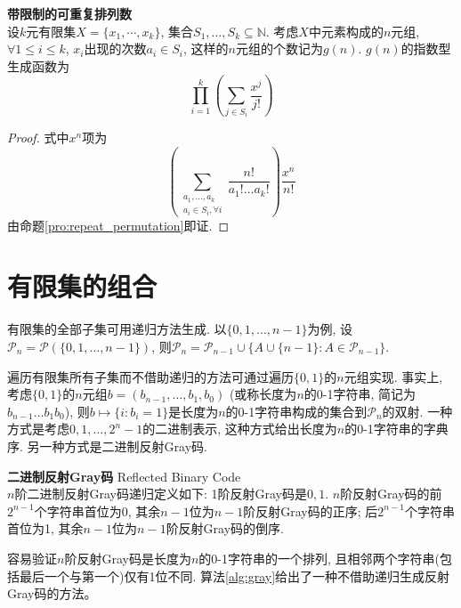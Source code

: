 \begin{pro} \textbf{带限制的可重复排列数}\\
设$k$元有限集$X=\{x_1,\cdots,x_k\}$, 集合$S_1,\dots, S_k\subseteq \mathbb{N}$. 考虑$X$中元素构成的$n$元组, $\forall 1\le i \le k$, $x_i$出现的次数$a_i\in S_i$, 这样的$n$元组的个数记为$g(n)$. $g(n)$的指数型生成函数为
\begin{equation}
    \prod_{i=1}^k \left(\sum_{j\in S_i} \frac{x^j}{j!}\right)
\end{equation}
\end{pro}
\begin{proof}
式中$x^n$项为
\begin{equation*}
\left(\sum_{\substack{a_1,\dots,a_k\\a_i\in S_i, \forall i}} \frac{n!}{a_1!\dots a_k!} \right)\frac{x^n}{n!}
\end{equation*}
由命题\ref{pro:repeat_permutation}即证. 
\end{proof}

\section{有限集的组合}

\par 有限集的全部子集可用递归方法生成. 以$\{0,1,\dots,n-1\}$为例, 设$\mathcal{P}_{n}=\mathcal{P}(\{0,1,\dots,n-1\})$, 则$\mathcal{P}_{n} = \mathcal{P}_{n-1} \cup \{A\cup \{n-1\}: A\in \mathcal{P}_{n-1}\}$.

\par 遍历有限集所有子集而不借助递归的方法可通过遍历$\{0,1\}$的$n$元组实现. 事实上, 考虑$\{0,1\}$的$n$元组$b=(b_{n-1}, \dots, b_1, b_0)$ (或称长度为$n$的0-1字符串, 简记为$b_{n-1}\dots b_1 b_0$), 则$b\mapsto \{i: b_i=1\}$是长度为$n$的0-1字符串构成的集合到$\mathcal{P}_n$的双射. 一种方式是考虑$0,1,\dots,2^n-1$的二进制表示, 这种方式给出长度为$n$的0-1字符串的字典序. 另一种方式是二进制反射Gray码.

\begin{dfn}\textbf{二进制反射Gray码} Reflected Binary Code\\
$n$阶二进制反射Gray码递归定义如下: 1阶反射Gray码是$0,1$. $n$阶反射Gray码的前$2^{n-1}$个字符串首位为0, 其余$n-1$位为$n-1$阶反射Gray码的正序; 后$2^{n-1}$个字符串首位为1, 其余$n-1$位为$n-1$阶反射Gray码的倒序. 
\end{dfn}
容易验证$n$阶反射Gray码是长度为$n$的0-1字符串的一个排列, 且相邻两个字符串(包括最后一个与第一个)仅有1位不同. 算法\ref{alg:gray}给出了一种不借助递归生成反射Gray码的方法。

